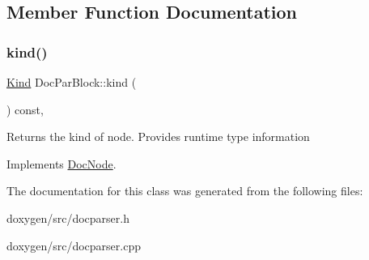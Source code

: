 \subsection{Member Function Documentation}
\mbox{\label{class_doc_par_block_a4d701db8324ba46e7dbe801bf2cbecef}} 
\subsubsection{\texorpdfstring{kind()}{kind()}}
{\footnotesize\ttfamily \mbox{\hyperlink{class_doc_node_aebd16e89ca590d84cbd40543ea5faadb}{Kind}} Doc\+Par\+Block\+::kind (\begin{DoxyParamCaption}{ }\end{DoxyParamCaption}) const\hspace{0.3cm}{\ttfamily [inline]}, {\ttfamily [virtual]}}

Returns the kind of node. Provides runtime type information 

Implements \mbox{\hyperlink{class_doc_node_a108ffd214a72ba6e93dac084a8f58049}{Doc\+Node}}.



The documentation for this class was generated from the following files\+:\begin{DoxyCompactItemize}
\item 
doxygen/src/docparser.\+h\item 
doxygen/src/docparser.\+cpp\end{DoxyCompactItemize}
